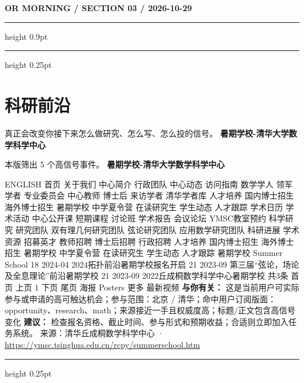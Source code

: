 \documentclass[10.5pt]{ctexart}
\begin{document}
\newpage
{\small\bfseries OR MORNING / SECTION 03 / 2026-10-29}
\vspace{2mm}
\hrule height 0.9pt
\vspace{1.5mm}
\hrule height 0.25pt
\vspace{4mm}
\section*{科研前沿}
{\color{ormuted} 真正会改变你接下来怎么做研究、怎么写、怎么投的信号。}
\vspace{2mm}
{\LARGE\bfseries 暑期学校-清华大学数学科学中心}\par
\vspace{1mm}
{\color{ormuted} 本版筛出 5 个高信号事件。}
\vspace{3mm}
{\Large\bfseries 暑期学校-清华大学数学科学中心}\par
ENGLISH 首页 关于我们 中心简介 行政团队 中心动态 访问指南 数学学人 领军学者 专业委员会 中心教师 博士后 来访学者 清华学者库 人才培养 国内博士招生 海外博士招生 暑期学校 中学夏令营 在读研究生 学生动态 人才跟踪 学术日历 学术活动 中心公开课 短期课程 讨论班 学术报告 会议论坛 YMSC教室预约 科学研究 研究团队 双有理几何研究团队 弦论研究团队 应用数学研究团队 科研进展 学术资源 招募英才 教师招聘 博士后招聘 行政招聘 人才培养 国内博士招生 海外博士招生 暑期学校 中学夏令营 在读研究生 学生动态 人才跟踪 暑期学校 Summer School 18 2024-04 2024拓扑前沿暑期学校报名开启 21 2023-09 第三届“弦论，场论及全息理论”前沿暑期学校 21 2023-09 2022丘成桐数学科学中心暑期学校 共3条 首页 上页 1 下页 尾页 海报 Posters 更多 最新视频
\textbf{与你有关：} 这是当前用户可实际参与或申请的高可触达机会；参与范围：北京 / 清华；命中用户订阅版面：opportunity、research、math；来源接近一手且权威度高；标题/正文包含高信号变化
\textbf{建议：} 检查报名资格、截止时间、参与形式和预期收益；合适则立即加入任务系统。
{\footnotesize\color{ormuted} 来源：清华丘成桐数学科学中心 · \url{https://ymsc.tsinghua.edu.cn/rcpy/summerschool.htm}}
\vspace{4mm}
\hrule height 0.25pt
\vspace{3mm}
\end{document}
